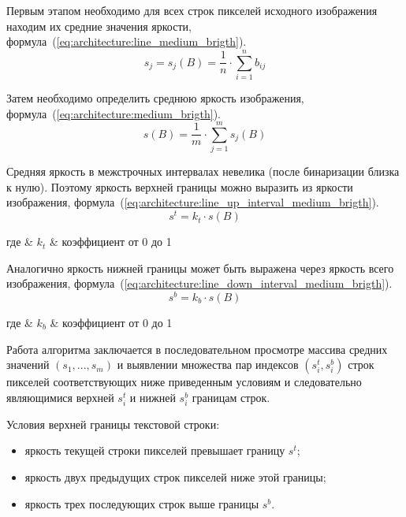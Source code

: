 Первым этапом необходимо для всех строк пикселей исходного изображения находим их средние значения яркости, формула~(\ref{eq:architecture:line_medium_brigth}).
\begin{equation}
  \label{eq:architecture:line_medium_brigth}
  s_j = s_j(B) = \frac{1}{n}\cdot\sum\limits_{i=1}^{n} b_{ij}
\end{equation}

Затем необходимо определить среднюю яркость изображения, \mbox{формула~(\ref{eq:architecture:medium_brigth}).}
\begin{equation}
  \label{eq:architecture:medium_brigth}
  s(B) = \frac{1}{m}\cdot\sum\limits_{j=1}^{m} s_j(B)
\end{equation}

Средняя яркость в межстрочных интервалах невелика (после бинаризации близка к нулю). Поэтому яркость верхней границы можно выразить из яркости изображения, формула~(\ref{eq:architecture:line_up_interval_medium_brigth}).
\begin{equation}
  \label{eq:architecture:line_up_interval_medium_brigth}
  s^{t} = k_{t} \cdot s(B)
\end{equation}
\begin{explanation}
где & $ k_{t} $ & коэффициент от 0 до 1
\end{explanation}

Аналогично яркость нижней границы может быть выражена через яркость всего изображения, формула~(\ref{eq:architecture:line_down_interval_medium_brigth}).
\begin{equation}
  \label{eq:architecture:line_down_interval_medium_brigth}
  s^{b} = k_{b} \cdot s(B)
\end{equation}
\begin{explanation}
где & $ k_{b} $ & коэффициент от 0 до 1
\end{explanation}

Работа алгоритма заключается в последовательном просмотре массива средних значений $ (s_1,...,s_m) $ и выявлении множества пар индексов $ (s^t_i,s^b_i) $ строк пикселей соответствующих ниже приведенным условиям и следовательно являющимися верхней $ s^t_i $ и нижней $ s^b_i $ границам строк. 

Условия верхней границы текстовой строки:
\begin{itemize}
  \item яркость текущей строки пикселей превышает границу $ s^{t} $;
  \item яркость двух предыдущих строк пикселей ниже этой границы;
  \item яркость трех последующих строк выше границы $ s^{b} $.
\end{itemize}

